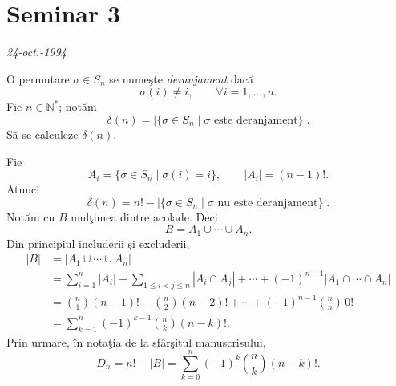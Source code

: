 
\section{Seminar 3}
\begin{flushright}
\textit{24-oct.-1994}
\end{flushright}

\noindent{}\quad O permutare $\sigma\in S_n$ se numeşte
\emph{deranjament} dacă
\[
  \sigma(i)\neq i,\qquad \forall i=1,\ldots,n.
\]
Fie $n\in\mathbb N^{*}$; notăm
\[
 \delta(n)=\bigl|\{\sigma\in S_n\mid\sigma\text{ este deranjament}\}\bigr|.
\]
Să se calculeze $\delta(n)$.

\medskip
\noindent Fie
\[
 A_i=\{\sigma\in S_n\mid\sigma(i)=i\},
 \qquad |A_i|=(n-1)!.
\]
Atunci
\[
 \delta(n)=n!-\bigl|\{\sigma\in S_n\mid
                   \sigma\text{ nu este deranjament}\}\bigr|.
\]
Notăm cu $B$ mulţimea dintre acolade. Deci
\[
 B=A_1\cup\cdots\cup A_n.
\]
Din principiul includerii şi excluderii,
\[
\begin{aligned}
 |B|
 &=|A_1\cup\cdots\cup A_n|\\
 &=\sum_{i=1}^{n}|A_i|
    -\sum_{1\le i<j\le n}|A_i\cap A_j|+\cdots
      +(-1)^{n-1}|A_1\cap\cdots\cap A_n|\\[3pt]
 &=\binom n1(n-1)!-\binom n2(n-2)!+\cdots
      +(-1)^{n-1}\binom nn\,0!\\[3pt]
 &=\sum_{k=1}^{n}(-1)^{k-1}\binom nk(n-k)!.
\end{aligned}
\]
Prin urmare, în notaţia de la sfârşitul manuscrisului,
\[
 \boxed{D_n=n!-|B|=\sum_{k=0}^{n}(-1)^k\binom nk(n-k)!}.
\]

